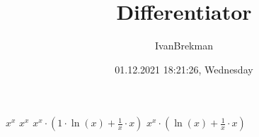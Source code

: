 \documentclass{article}
\title{Differentiator}
\author{IvanBrekman}
\date{01.12.2021 18:21:26, Wednesday}
\begin{document}
\maketitle

$ {x}^{x} $
$ {x}^{x} $
$ {x}^{x} \cdot (1 \cdot \ln{(x)} + \frac{1}{x} \cdot x) $
$ {x}^{x} \cdot (\ln{(x)} + \frac{1}{x} \cdot x) $
\end{document}
